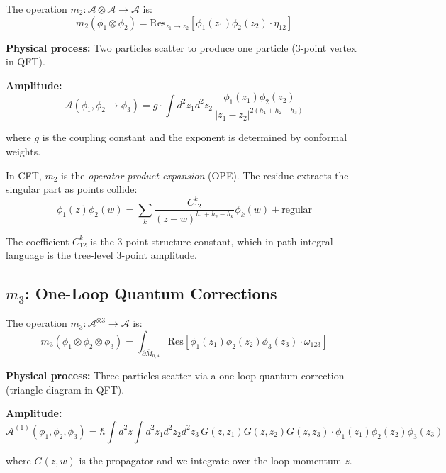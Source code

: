 \begin{example}[Binary Product = Classical OPE]
\label{ex:m2-tree-level}
The operation $m_2: \mathcal{A} \otimes \mathcal{A} \to \mathcal{A}$ is:
$$m_2(\phi_1 \otimes \phi_2) = \text{Res}_{z_1 \to z_2}[\phi_1(z_1)\phi_2(z_2) \cdot 
\eta_{12}]$$

\textbf{Physical process:} Two particles scatter to produce one particle (3-point 
vertex in QFT).

\textbf{Amplitude:}
$$\mathcal{A}(\phi_1, \phi_2 \to \phi_3) = g \cdot \int d^2z_1 d^2z_2 \, 
\frac{\phi_1(z_1)\phi_2(z_2)}{|z_1-z_2|^{2(h_1+h_2-h_3)}}$$

where $g$ is the coupling constant and the exponent is determined by conformal weights.
\end{example}

\begin{remark}\label{rem:witten-m2}
In CFT, $m_2$ is the \emph{operator product expansion} (OPE). The residue extracts 
the singular part as points collide:
$$\phi_1(z)\phi_2(w) = \sum_k \frac{C_{12}^k}{(z-w)^{h_1+h_2-h_k}} \phi_k(w) + 
\text{regular}$$

The coefficient $C_{12}^k$ is the 3-point structure constant, which in path integral 
language is the tree-level 3-point amplitude.
\end{remark}

\subsection{$m_3$: One-Loop Quantum Corrections}

\begin{example}[Ternary Operation = Triangle Diagram]
\label{ex:m3-one-loop}
The operation $m_3: \mathcal{A}^{\otimes 3} \to \mathcal{A}$ is:
$$m_3(\phi_1 \otimes \phi_2 \otimes \phi_3) = \int_{\partial\overline{M}_{0,4}} 
\text{Res}[\phi_1(z_1)\phi_2(z_2)\phi_3(z_3) \cdot \omega_{123}]$$

\textbf{Physical process:} Three particles scatter via a one-loop quantum correction 
(triangle diagram in QFT).

\textbf{Amplitude:}
$$\mathcal{A}^{(1)}(\phi_1,\phi_2,\phi_3) = \hbar \int d^2z \int d^2z_1 d^2z_2 d^2z_3 
\, G(z,z_1)G(z,z_2)G(z,z_3) \cdot \phi_1(z_1)\phi_2(z_2)\phi_3(z_3)$$

where $G(z,w)$ is the propagator and we integrate over the loop momentum $z$.
\end{example}


